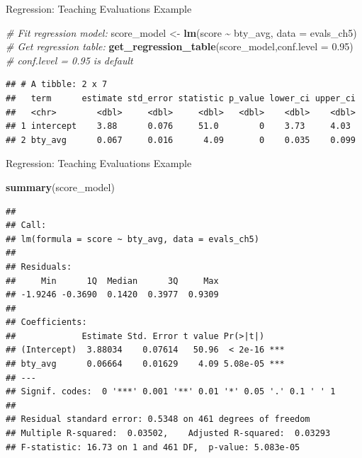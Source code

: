 \documentclass[
  ignorenonframetext,
]{beamer}
\newenvironment{Shaded}{\begin{snugshade}}{\end{snugshade}}
\newcommand{\AttributeTok}[1]{\textcolor[rgb]{0.13,0.29,0.53}{#1}}
\newcommand{\CommentTok}[1]{\textcolor[rgb]{0.56,0.35,0.01}{\textit{#1}}}
\newcommand{\FloatTok}[1]{\textcolor[rgb]{0.00,0.00,0.81}{#1}}
\newcommand{\FunctionTok}[1]{\textcolor[rgb]{0.13,0.29,0.53}{\textbf{#1}}}
\newcommand{\NormalTok}[1]{#1}
\newcommand{\OtherTok}[1]{\textcolor[rgb]{0.56,0.35,0.01}{#1}}
\newcommand{\SpecialCharTok}[1]{\textcolor[rgb]{0.81,0.36,0.00}{\textbf{#1}}}
\begin{document}
\begin{frame}[fragile]{Regression: Teaching Evaluations Example}
\protect\hypertarget{regression-teaching-evaluations-example-4}{}
\tiny

\begin{Shaded}
\begin{Highlighting}[]
\CommentTok{\# Fit regression model:}
\NormalTok{score\_model }\OtherTok{\textless{}{-}} \FunctionTok{lm}\NormalTok{(score }\SpecialCharTok{\textasciitilde{}}\NormalTok{ bty\_avg, }\AttributeTok{data =}\NormalTok{ evals\_ch5)}
\CommentTok{\# Get regression table:}
\FunctionTok{get\_regression\_table}\NormalTok{(score\_model,}\AttributeTok{conf.level =} \FloatTok{0.95}\NormalTok{) }\CommentTok{\# conf.level = 0.95 is default}
\end{Highlighting}
\end{Shaded}

\begin{verbatim}
## # A tibble: 2 x 7
##   term      estimate std_error statistic p_value lower_ci upper_ci
##   <chr>        <dbl>     <dbl>     <dbl>   <dbl>    <dbl>    <dbl>
## 1 intercept    3.88      0.076     51.0        0    3.73     4.03 
## 2 bty_avg      0.067     0.016      4.09       0    0.035    0.099
\end{verbatim}

\normalsize
\end{frame}

\begin{frame}[fragile]{Regression: Teaching Evaluations Example}
\protect\hypertarget{regression-teaching-evaluations-example-5}{}
\tiny

\begin{Shaded}
\begin{Highlighting}[]
\FunctionTok{summary}\NormalTok{(score\_model)}
\end{Highlighting}
\end{Shaded}

\begin{verbatim}
## 
## Call:
## lm(formula = score ~ bty_avg, data = evals_ch5)
## 
## Residuals:
##     Min      1Q  Median      3Q     Max 
## -1.9246 -0.3690  0.1420  0.3977  0.9309 
## 
## Coefficients:
##             Estimate Std. Error t value Pr(>|t|)    
## (Intercept)  3.88034    0.07614   50.96  < 2e-16 ***
## bty_avg      0.06664    0.01629    4.09 5.08e-05 ***
## ---
## Signif. codes:  0 '***' 0.001 '**' 0.01 '*' 0.05 '.' 0.1 ' ' 1
## 
## Residual standard error: 0.5348 on 461 degrees of freedom
## Multiple R-squared:  0.03502,    Adjusted R-squared:  0.03293 
## F-statistic: 16.73 on 1 and 461 DF,  p-value: 5.083e-05
\end{verbatim}

\normalsize
\end{frame}
\end{document}
